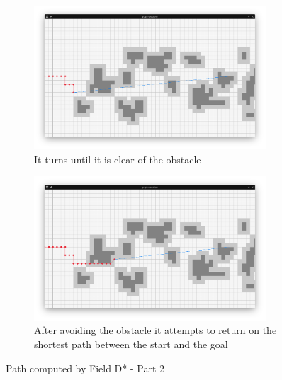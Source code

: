 \begin{figure}
	\begin{center}
		\begin{subfigure}[t]{\textwidth}
			\includegraphics[width=0.95\textwidth]{./img/gv_3.png}
			\caption{It turns until it is clear of the obstacle}\label{fig:gv-3}
		\end{subfigure}
		\begin{subfigure}[t]{\textwidth}
			\includegraphics[width=0.95\textwidth]{./img/gv_4.png}
			\caption{After avoiding the obstacle it attempts to return on the shortest path between the start and the goal}\label{fig:gv-4}
		\end{subfigure}
	\end{center}
	\caption{Path computed by Field D* - Part 2}\label{fig:gv-b}
\end{figure}
